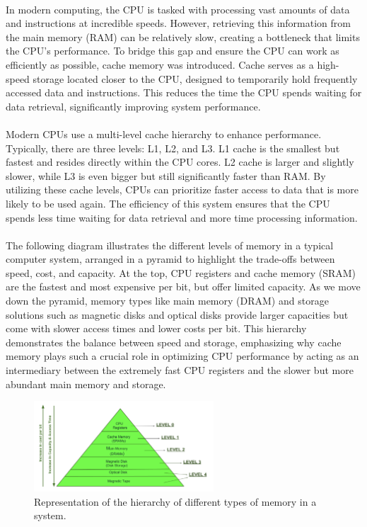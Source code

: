     \paragraph*{}
    In modern computing, the CPU is tasked with processing vast amounts of data and instructions at incredible speeds. 
    However, retrieving this information from the main memory (RAM) can be relatively slow, creating a bottleneck that 
    limits the CPU's performance. To bridge this gap and ensure the CPU can work as efficiently as possible, cache 
    memory was introduced. Cache serves as a high-speed storage located closer to the CPU, designed to temporarily 
    hold frequently accessed data and instructions. This reduces the time the CPU spends waiting for data retrieval, 
    significantly improving system performance.
    \par

    \paragraph*{}
    Modern CPUs use a multi-level cache hierarchy to enhance performance. Typically, there are three levels: L1, L2, 
    and L3. L1 cache is the smallest but fastest and resides directly within the CPU cores. L2 cache is larger and 
    slightly slower, while L3 is even bigger but still significantly faster than RAM. By utilizing these cache 
    levels, CPUs can prioritize faster access to data that is more likely to be used again. The efficiency of 
    this system ensures that the CPU spends less time waiting for data retrieval and more time processing information.
    \par

    \paragraph*{}
    The following diagram illustrates the different levels of memory in a typical computer system, arranged in a pyramid to 
    highlight the trade-offs between speed, cost, and capacity. At the top, CPU registers and cache memory (SRAM) 
    are the fastest and most expensive per bit, but offer limited capacity. As we move down the pyramid, memory types 
    like main memory (DRAM) and storage solutions such as magnetic disks and optical disks provide larger capacities 
    but come with slower access times and lower costs per bit. This hierarchy demonstrates the balance between speed 
    and storage, emphasizing why cache memory plays such a crucial role in optimizing CPU performance by acting as 
    an intermediary between the extremely fast CPU registers and the slower but more abundant main memory and storage.

    \begin{figure}[h]
        \begin{center}
            \includegraphics[width=0.6\textwidth]{Figures/herarchy.png}
        \end{center}
        \caption{Representation of the hierarchy of different types of memory in a system.}
        \label{}
    \end{figure}

\newpage